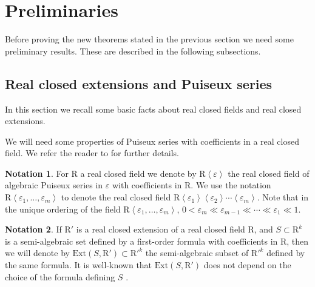 \documentclass{amsart}
\theoremstyle{definition}
\newtheorem{notation}{Notation}
\theoremstyle{remark}
\numberwithin{equation}{section}
\begin{document}
\section{Preliminaries}
\label{sec:preliminaries}
Before proving the new theorems stated in the previous section we need some preliminary results.
These are described in the following subsections.

\subsection{Real closed extensions and Puiseux series}
\label{subsec:Puiseux}
In this section we recall some basic facts about real closed fields and real
closed extensions.

We will need some
properties of Puiseux series with coefficients in a real closed field. We
refer the reader to {\cite{BPRbook2}} for further details.

\begin{notation}
\label{not:Puiseux}
  For ${\mathrm{R}}$ a real closed field we denote by ${\mathrm{R}} \left\langle {{\varepsilon}}
  \right\rangle$ the real closed field of algebraic Puiseux series in ${{\varepsilon}}$
  with coefficients in ${\mathrm{R}}$. We use the notation ${\mathrm{R}} \left\langle {{\varepsilon}}_{1} ,
  \ldots , {{\varepsilon}}_{m} \right\rangle$ to denote the real closed field ${\mathrm{R}}
  \left\langle {{\varepsilon}}_{1} \right\rangle \left\langle {{\varepsilon}}_{2} \right\rangle
  \cdots \left\langle {{\varepsilon}}_{m} \right\rangle$. Note that in the unique
  ordering of the field ${\mathrm{R}} \left\langle {{\varepsilon}}_{1} , \ldots , {{\varepsilon}}_{m}
  \right\rangle$, $0< {{\varepsilon}}_{m} \ll {{\varepsilon}}_{m-1} \ll \cdots \ll {{\varepsilon}}_{1} \ll 1$.
\end{notation}

\begin{notation}
\label{not:Ext}
  If ${\mathrm{R}}'$ is a real closed extension of a real closed field ${\mathrm{R}}$, and $S
  \subset {\mathrm{R}}^{k}$ is a semi-algebraic set defined by a first-order formula
  with coefficients in ${\mathrm{R}}$, then we will denote by ${\mathrm{Ext}} \left(S, {\mathrm{R}}'
  \right) \subset {\mathrm{R}}'^{k}$ the semi-algebraic subset of ${\mathrm{R}}'^{k}$ defined by
  the same formula. It is well-known that ${\mathrm{Ext}} \left(S, {\mathrm{R}}' \right)$ does
  not depend on the choice of the formula defining $S$ {\cite{BPRbook2}}.
\end{notation}
\end{document}
